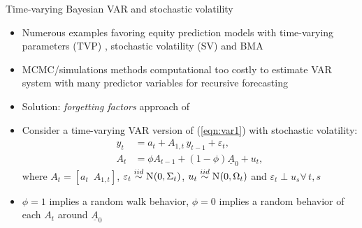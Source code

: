 \documentclass[9pt,xcolor=x11names,compress]{beamer}
\let\natbibcitep\citep
\renewcommand\citep{\bibpunct{(}{)}{;}{a}{,}{;}\natbibcitep}
\let\oldcite=\cite
\renewcommand{\cite}[1]{\textcolor{dblue}{\oldcite{#1}}}
\theoremstyle{standard}
\theoremstyle{notes}
\newcommand{\No}[1]{\text{N}\hspace{-0.05cm}\left(#1\right)}
\begin{document}
\begin{frame}{Time-varying Bayesian VAR and stochastic volatility}
	\begin{itemize}
		\item Numerous examples favoring equity prediction models with time-varying parameters (TVP) \citep{dangl2012}, stochastic volatility (SV) \citep{johannes2014} and BMA \citep{pettenuzzo2016}
		\item MCMC/simulations methods computational too costly to estimate VAR system with many predictor variables for recursive forecasting
		\item Solution: \textit{forgetting factors} approach of \cite{koop2013} 
		\item Consider a time-varying VAR version of (\ref{eqn:var1}) with stochastic volatility:
		\begin{align}\label{eqn:tvpvar1}
		y_t&=a_t+A_{1,t}\,y_{t-1}+\varepsilon_t,\\
		A_t&=\phi A_{t-1}+(1-\phi)\underline{A}_0+u_t,\label{eqn:tvpvar2}
		\end{align}
		where $A_t=[a_t\,\,\, A_{1,t}]$, $\varepsilon_t\stackrel{iid}{\sim}\No{0,\Sigma_t}$, $u_t\stackrel{iid}{\sim}\No{0,\Omega_t}$ and $\varepsilon_t\perp u_s\forall\,t,s$
		\item $\phi=1$ implies a random walk behavior, $\phi=0$ implies a random behavior of each $A_t$ around $\underline{A}_0$
	\end{itemize}
\end{frame}
\end{document}
